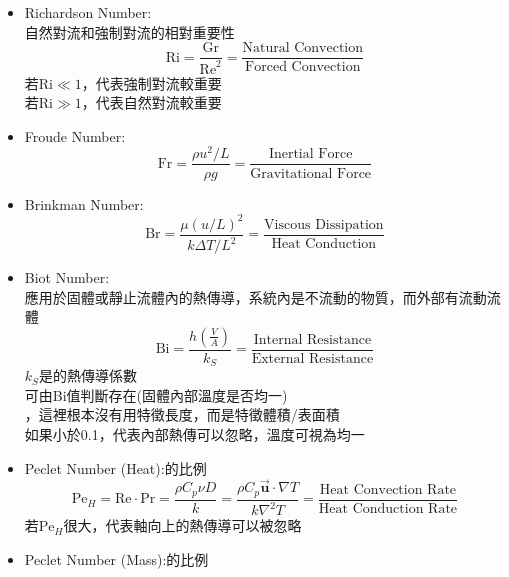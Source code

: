 \documentclass[../main.tex]{subfiles}
\begin{document}
\begin{itemize}
\begin{itemize}
    Ra用於判斷自然對流和熱傳導的相對重要性\\
    若$\text{Ra} < 10^6$，代表熱傳導較重要\\
    若$\text{Ra} > 10^6$，代表自然對流較重要
  \item Richardson Number:\\
    自然對流和強制對流的相對重要性
    \begin{equation}
      \text{Ri} = \frac{\text{Gr}}{\text{Re}^2} = \frac{\text{Natural Convection}}{\text{Forced Convection}}
    \end{equation}
    若$\text{Ri} \ll 1$，代表強制對流較重要\\
    若$\text{Ri} \gg 1$，代表自然對流較重要
  \item Froude Number:
    \begin{equation}
      \text{Fr} = \frac{\rho u^2/L}{\rho g} = \frac{\text{Inertial Force}}{\text{Gravitational Force}}
    \end{equation} 
  \item Brinkman Number:
    \begin{equation}
      \text{Br} = \frac{\mu (u/L)^2}{k\Delta T/L^2} = \frac{\text{Viscous Dissipation}}{\text{Heat Conduction}}
    \end{equation}
  \item Biot Number:\\
    應用於固體或靜止流體內的熱傳導，系統內是不流動的物質，而外部有流動流體
    \begin{equation}
      \text{Bi} = \frac{h\left(\frac{V}{A}\right)}{k_S} = \frac{\text{Internal Resistance}}{\text{External Resistance}}
    \end{equation}
    $k_S$是的熱傳導係數\\
    可由Bi值判斷存在(固體內部溫度是否均一)\\
    ，這裡根本沒有用特徵長度，而是特徵體積/表面積\\
    如果小於0.1，代表內部熱傳可以忽略，溫度可視為均一
  \item Peclet Number (Heat):的比例
    \begin{equation}
      \boxed{\text{Pe}_H =\text{Re}\cdot\text{Pr} = \frac{\rho C_p\nu D}{k} 
      = \frac{\rho C_p \vec{\bm u}\cdot \nabla T}{k\nabla^2 T}
      = \frac{\text{Heat Convection Rate}}{\text{Heat Conduction Rate}}}
    \end{equation}
    若$\text{Pe}_H$很大，代表軸向上的熱傳導可以被忽略
  \item Peclet Number (Mass):的比例

\end{itemize}
\end{itemize}
\end{document}

